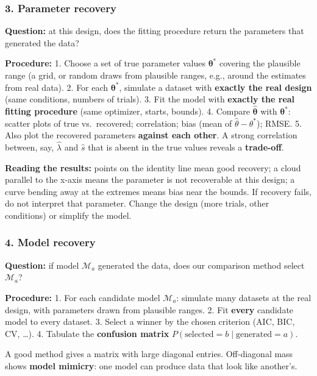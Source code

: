 \subsubsection{3. Parameter recovery}

\textbf{Question:} at this design, does the fitting procedure return the
parameters that generated the data?

\textbf{Procedure:} 1. Choose a set of true parameter values
\(\boldsymbol\theta^\ast\) covering the plausible range (a grid, or
random draws from plausible ranges, e.g., around the estimates from real
data). 2. For each \(\boldsymbol\theta^\ast\), simulate a dataset with
\textbf{exactly the real design} (same conditions, numbers of trials).
3. Fit the model with \textbf{exactly the real fitting procedure} (same
optimizer, starts, bounds). 4. Compare \(\hat{\boldsymbol\theta}\) with
\(\boldsymbol\theta^\ast\): scatter plots of true vs.~recovered;
correlation; bias (mean of \(\hat\theta - \theta^\ast\)); RMSE. 5. Also
plot the recovered parameters \textbf{against each other}. A strong
correlation between, say, \(\hat\lambda\) and \(\hat s\) that is absent
in the true values reveals a \textbf{trade-off}.

\textbf{Reading the results:} points on the identity line mean good
recovery; a cloud parallel to the x-axis means the parameter is not
recoverable at this design; a curve bending away at the extremes means
bias near the bounds. If recovery fails, do not interpret that
parameter. Change the design (more trials, other conditions) or simplify
the model.

\subsubsection{4. Model recovery}

\textbf{Question:} if model \(\mathcal{M}_a\) generated the data, does
our comparison method select \(\mathcal{M}_a\)?

\textbf{Procedure:} 1. For each candidate model \(\mathcal{M}_a\):
simulate many datasets at the real design, with parameters drawn from
plausible ranges. 2. Fit \textbf{every} candidate model to every
dataset. 3. Select a winner by the chosen criterion (AIC, BIC, CV,
\ldots). 4. Tabulate the \textbf{confusion matrix}
\(P(\text{selected} = b \mid \text{generated} = a)\).

A good method gives a matrix with large diagonal entries. Off-diagonal
mass shows \textbf{model mimicry}: one model can produce data that look
like another's.

